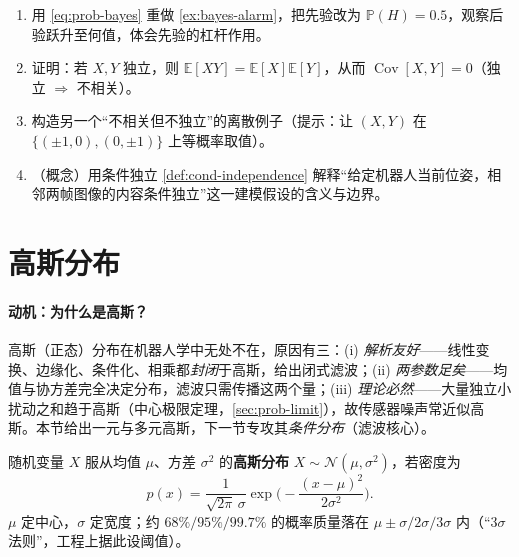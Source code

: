 \begin{practice}
\begin{enumerate}
  \item 用 \cref{eq:prob-bayes} 重做 \cref{ex:bayes-alarm}，把先验改为 $\mathbb{P}(H)=0.5$，观察后验跃升至何值，体会先验的杠杆作用。
  \item 证明：若 $X,Y$ 独立，则 $\mathbb{E}[XY]=\mathbb{E}[X]\mathbb{E}[Y]$，从而 $\operatorname{Cov}[X,Y]=0$（独立 $\Rightarrow$ 不相关）。
  \item 构造另一个“不相关但不独立”的离散例子（提示：让 $(X,Y)$ 在 $\{(\pm1,0),(0,\pm1)\}$ 上等概率取值）。
  \item （概念）用条件独立 \cref{def:cond-independence} 解释“给定机器人当前位姿，相邻两帧图像的内容条件独立”这一建模假设的含义与边界。
\end{enumerate}
\end{practice}

\section{高斯分布}
\label{sec:prob-gauss}

\paragraph{动机：为什么是高斯？}
高斯（正态）分布在机器人学中无处不在，原因有三：(i) \emph{解析友好}——线性变换、边缘化、条件化、相乘都\emph{封闭}于高斯，给出闭式滤波；(ii) \emph{两参数足矣}——均值与协方差完全决定分布，滤波只需传播这两个量；(iii) \emph{理论必然}——大量独立小扰动之和趋于高斯（中心极限定理，\cref{sec:prob-limit}），故传感器噪声常近似高斯。本节给出一元与多元高斯，下一节专攻其\emph{条件分布}（滤波核心）。

\begin{definition}[一元高斯]\label{def:gauss-1d}
随机变量 $X$ 服从均值 $\mu$、方差 $\sigma^2$ 的\textbf{高斯分布} $X\sim\mathcal{N}(\mu,\sigma^2)$，若密度为
\begin{equation}
  p(x)=\frac{1}{\sqrt{2\pi}\,\sigma}\exp\!\Big(\!-\frac{(x-\mu)^2}{2\sigma^2}\Big).
  \label{eq:gauss-1d}
\end{equation}
$\mu$ 定中心，$\sigma$ 定宽度；约 $68\%/95\%/99.7\%$ 的概率质量落在 $\mu\pm\sigma/2\sigma/3\sigma$ 内（“$3\sigma$ 法则”，工程上据此设阈值）。
\end{definition}

